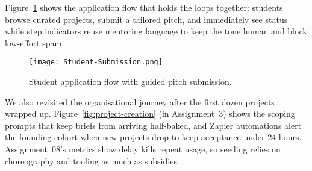 Figure~\ref{fig:application-flow} shows the application flow that holds the loops together: students browse curated projects, submit a tailored pitch, and immediately see status while step indicators reuse mentoring language to keep the tone human and block low-effort spam.

\begin{figure}[H]
  \centering
  \texttt{[image: Student-Submission.png]}
  \caption{Student application flow with guided pitch submission.}
  \label{fig:application-flow}
\end{figure}

We also revisited the organisational journey after the first dozen projects wrapped up. Figure~\ref{fig:project-creation} (in Assignment~3) shows the scoping prompts that keep briefs from arriving half-baked, and Zapier automations alert the founding cohort when new projects drop to keep acceptance under 24 hours. Assignment~08's metrics show delay kills repeat usage, so seeding relies on choreography and tooling as much as subsidies.
